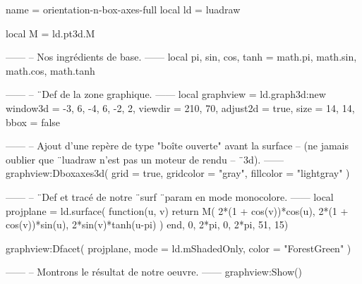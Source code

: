 \documentclass[border = 3pt]{standalone}
\begin{document}
\begin{luadraw}{name = orientation-n-box-axes-full}
local ld = luadraw

local M = ld.pt3d.M

------
-- Nos ingrédients de base.
------
local pi, sin, cos, tanh = math.pi, math.sin, math.cos, math.tanh

------
-- ¨Def de la zone graphique.
------
local graphview = ld.graph3d:new{
  window3d = {-3, 6, -4, 6, -2, 2},
  viewdir  = {210, 70},
  adjust2d = true,
  size     = {14, 14},
  bbox     = false
}

------
-- Ajout d'une repère de type "boîte ouverte" avant la surface
-- (ne jamais oublier que ¨luadraw n'est pas un moteur de rendu
-- ¨3d).
------
graphview:Dboxaxes3d({
  grid      = true,
  gridcolor = "gray",
  fillcolor = "lightgray"
})

------
-- ¨Def et tracé de notre ¨surf ¨param en mode monocolore.
------
local projplane = ld.surface(
  function(u, v)
    return M(
      2*(1 + cos(v))*cos(u),
      2*(1 + cos(v))*sin(u),
      2*sin(v)*tanh(u-pi)
    )
  end,
  0, 2*pi, 0, 2*pi,
  {51, 15})

graphview:Dfacet(
  projplane,
  {
    mode  = ld.mShadedOnly,
    color = "ForestGreen"
  })

------
-- Montrons le résultat de notre oeuvre.
------
graphview:Show()
\end{luadraw}
\end{document}
